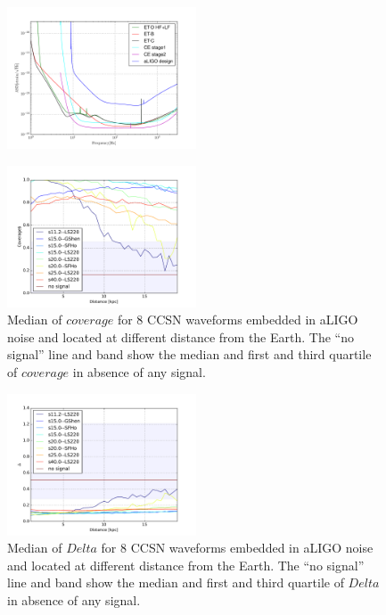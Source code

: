 \begin{figure}
 \centering
 \includegraphics[width=0.5\textwidth]{plots/spectrum}
 \caption{} \label{fig:spectrum}
\end{figure}

\begin{figure}
  \centering
  \includegraphics[width=0.5\textwidth]{plots/aLIGO_cov_allwvfs}
 \caption{Median of $coverage$ for 8 CCSN waveforms embedded in aLIGO noise and located at different distance from the Earth. The ``no signal'' line and band show the median and first and third quartile of $coverage$ in absence of any signal.} \label{fig:aLIGO_cov_allwvf}
\end{figure}

\begin{figure}
  \centering
  \includegraphics[width=0.5\textwidth]{plots/aLIGO_prec_allwvfs}
 \caption{Median of $Delta$ for 8 CCSN waveforms embedded in aLIGO noise and located at different distance from the Earth. The ``no signal'' line and band show the median and first and third quartile of $Delta$ in absence of any signal.} \label{fig:aLIGO_prec_allwvf}
\end{figure}



